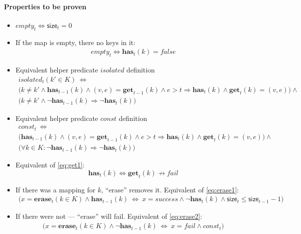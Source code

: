 \documentclass{article}
\renewcommand{\o}[1]{\ensuremath{\mathbf{#1}}}
\newcommand{\p}[1]{\ensuremath{\mathit{#1}}}
\newcommand{\s}[1]{\ensuremath{\mathsf{#1}}}
\begin{document}
\paragraph{Properties to be proven}
\begin{itemize}
\item $\p{empty}_t \Leftrightarrow \s{size}_t=0$
\item If the map is empty, there no keys in it:
  \begin{gather*}
    \p{empty}_t \Leftrightarrow \o{has}_t(k) = false
  \end{gather*}
\item Equivalent helper predicate \p{isolated} definition
  \begin{gather*}
    \p{isolated}_t(k'\in K) ~\Leftrightarrow~\nonumber\\
    \Big(k\neq k' \wedge \o{has}_{t-1}(k) \wedge (v,e)=\o{get}_{t-1}(k) \wedge e>t \Rightarrow \o{has}_t(k) \wedge \o{get}_t(k)=(v,e)\Big)\wedge\nonumber\\
    \Big(k\neq k' \wedge \neg \o{has}_{t-1}(k) \Rightarrow \neg\o{has}_t(k)\Big)
  \end{gather*}
\item Equivalent helper predicate \p{const} definition
  \begin{gather*}
    \p{const}_t ~\Leftrightarrow~\nonumber\\
    \Big(\o{has}_{t-1}(k) \wedge (v,e)=\o{get}_{t-1}(k) \wedge e>t \Rightarrow \o{has}_t(k) \wedge \o{get}_t(k)=(v,e)\Big)\wedge\nonumber\\
    \Big(\forall k\in K: \neg \o{has}_{t-1}(k) \Rightarrow \neg\o{has}_t(k)\Big)
  \end{gather*}

\item Equivalent of \eqref{eq:get1}:
  \[
  \o{has}_t(k) \Leftrightarrow \o{get}_t(k) \not\rightarrow fail
  \]
\item If there was a mapping for $k$, ``erase'' removes it. Equivalent of \eqref{eq:erase1}:
  \begin{gather*}
    \Big(x=\o{erase}_t(k\in K) \wedge \o{has}_{t-1}(k) ~\Leftrightarrow~ x=success \wedge \neg\o{has}_t(k) \wedge \s{size}_t \le \s{size}_{t-1}-1 \Big)
  \end{gather*}
\item If there were not --- ``erase'' will fail. Equivalent of \eqref{eq:erase2}:
  \begin{gather*}
    \Big(x=\o{erase}_t(k\in K) \wedge \neg\o{has}_{t-1}(k) ~\Leftrightarrow~ x=fail\wedge \p{const}_t\Big)
  \end{gather*}


\end{itemize}
\end{document}

